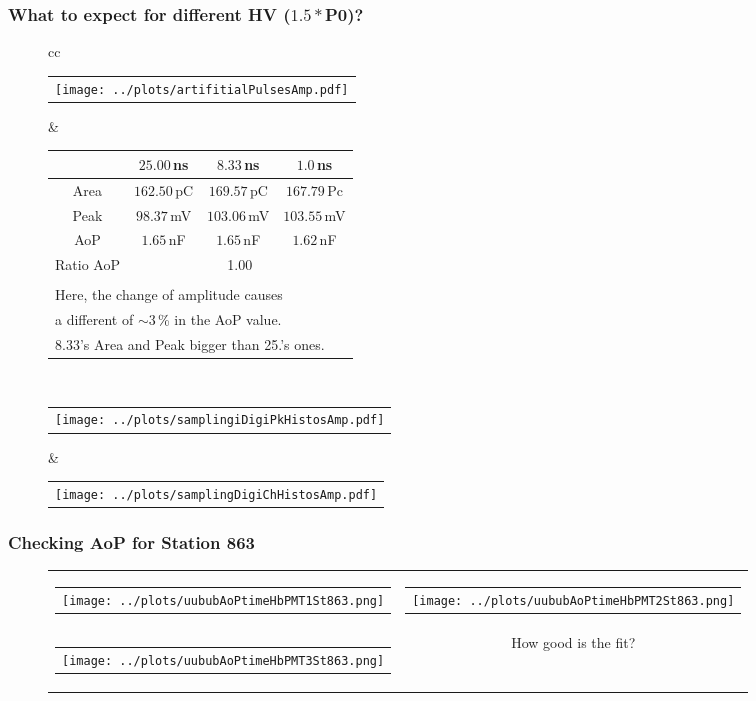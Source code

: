 \documentclass[aspectratio=169]{beamer}
\begin{document}
\begin{frame}
  \frametitle{What to expect for different HV ($1.5*$P0)?}
  \begin{figure}
    \centering
    \begin{tabularx}{\textwidth}{CC}
      \begin{tabular}{l}
        \texttt{[image: ../plots/artifitialPulsesAmp.pdf]}
      \end{tabular}
      &
      \footnotesize
      \begin{tabular}{c|c|c|c}
        {} & $25.00$\,ns & $8.33$\,ns & $1.0$\,ns \\ \hline
        Area & $162.50$\,pC & $169.57$\,pC & $167.79$\,Pc \\
        Peak & $98.37$\,mV & $103.06$\,mV & $103.55$\,mV \\
        AoP & $1.65$\,nF & $1.65$\,nF & $1.62$\,nF\\ \hline
        Ratio AoP & \multicolumn{3}{c}{1.00} \\
        \multicolumn{4}{c}{} \\
        \multicolumn{4}{l}{Here, the change of amplitude causes} \\
        \multicolumn{4}{l}{a different of $\sim3$\,\% in the AoP value.} \\
        \multicolumn{4}{l}{8.33's Area and Peak bigger than 25.'s ones.}
      \end{tabular}
      \\
      \begin{tabular}{l}
        \texttt{[image: ../plots/samplingiDigiPkHistosAmp.pdf]}
      \end{tabular}
      &
      \begin{tabular}{l}
        \texttt{[image: ../plots/samplingDigiChHistosAmp.pdf]}
      \end{tabular}
    \end{tabularx}
  \end{figure}
\end{frame}


\begin{frame}
  \frametitle{Checking AoP for Station 863}
  \begin{figure}
    \centering
    \begin{tabularx}{\textwidth}{CC}
      \begin{tabular}{l}
        \texttt{[image: ../plots/uububAoPtimeHbPMT1St863.png]}
      \end{tabular}
      &
      \begin{tabular}{l}
        \texttt{[image: ../plots/uububAoPtimeHbPMT2St863.png]}
      \end{tabular}
      \\
      \begin{tabular}{l}
        \texttt{[image: ../plots/uububAoPtimeHbPMT3St863.png]}
      \end{tabular}
      &
      How good is the fit?
    \end{tabularx}
  \end{figure}
\end{frame}
\end{document}
